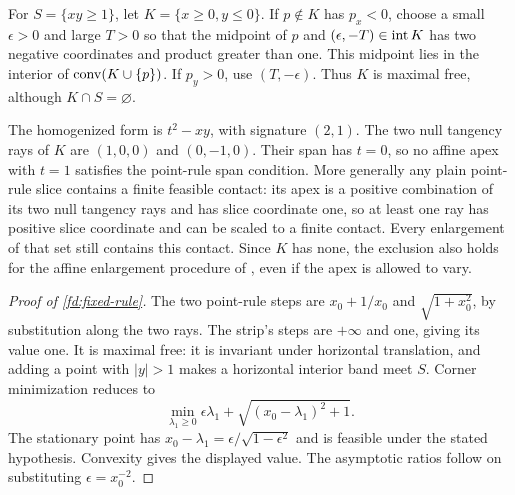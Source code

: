 \begin{example}
\label{fd:asymptotic-example}
For $S=\{xy\ge1\}$, let $K=\{x\ge0,y\le0\}$.
If $p\notin K$ has $p_x<0$, choose a small $\epsilon>0$ and large
$T>0$ so that the midpoint of $p$ and
$(\epsilon,-T)\in\operatorname{int} K$ has two negative coordinates and product
greater than one. This midpoint lies in the interior of
$\operatorname{conv}(K\cup\{p\})$. If $p_y>0$, use $(T,-\epsilon)$.
Thus $K$ is maximal free, although $K\cap S=\varnothing$.

The homogenized form is $t^2-xy$, with signature $(2,1)$.
The two null tangency rays of $K$ are $(1,0,0)$ and $(0,-1,0)$.
Their span has $t=0$, so no affine apex with $t=1$ satisfies the
point-rule span condition. More generally any plain point-rule
slice contains a finite feasible contact: its apex is a positive
combination of its two null tangency rays and has slice coordinate
one, so at least one ray has positive slice coordinate and can
be scaled to a finite contact. Every enlargement of that set
still contains this contact. Since $K$ has none, the exclusion
also holds for the affine enlargement procedure of
\citet{MPS2022}, even if the apex is allowed to vary.
\end{example}

\begin{proof}[Proof of \cref{fd:fixed-rule}]
\label{fd:fixed-rule-proof}
The two point-rule steps are $x_0+1/x_0$ and $\sqrt{1+x_0^2}$,
by substitution along the two rays. The strip's steps are
$+\infty$ and one, giving its value one.
It is maximal free: it is invariant under horizontal translation,
and adding a point with $|y|>1$ makes a horizontal interior band
meet $S$. Corner minimization reduces to
\[
 \min_{\lambda_1\ge0}
 \epsilon\lambda_1+\sqrt{(x_0-\lambda_1)^2+1}.
\]
The stationary point has
$x_0-\lambda_1=\epsilon/\sqrt{1-\epsilon^2}$ and is feasible
under the stated hypothesis. Convexity gives the displayed value.
The asymptotic ratios follow on substituting $\epsilon=x_0^{-2}$.
\end{proof}

